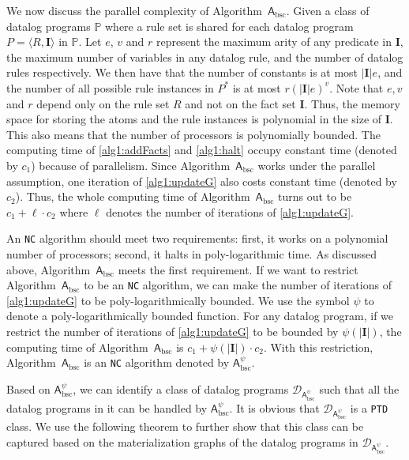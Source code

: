 We now discuss the parallel complexity of Algorithm~$\mathsf{A}_{\text{bsc}}$.
Given a class of datalog programs $\mathbb{P}$ where
a rule set is shared for each datalog program $P=\langle R, \textbf{I}\rangle$ in $\mathbb{P}$.
Let $e$, $v$ and $r$ represent the maximum arity of any predicate in $\textbf{I}$, the maximum number of variables
in any datalog rule, and the number of datalog rules respectively.
We then have that the number of
constants is at most $|\textbf{I}|e$, and the number of all possible rule instances in $P^*$
is at most $r(|\textbf{I}|e)^v$.
Note that $e, v$ and $r$ depend only on the rule set $R$ and not on the fact set $\textbf{I}$.
Thus, the memory space for storing the atoms and the rule instances is polynomial in the size of $\textbf{I}$.
This also means that the number of processors is polynomially bounded.
The computing time of \ref{alg1:addFacts} and \ref{alg1:halt} occupy constant time (denoted by $c_1$) because of parallelism.
Since Algorithm~$\mathsf{A}_{\text{bsc}}$ works under the parallel assumption, one iteration of
\ref{alg1:updateG} also costs constant time (denoted by $c_2$). Thus,
the whole computing time of Algorithm~$\mathsf{A}_{\text{bsc}}$ turns out to be $c_1+\ell\cdot c_2$
where $\ell$ denotes the number of iterations of \ref{alg1:updateG}.

An \texttt{NC} algorithm should meet two requirements: first,
it works on a polynomial number of processors; second, it halts in poly-logarithmic time.
As discussed above, Algorithm~$\mathsf{A}_{\text{bsc}}$ meets the first requirement.
If we want to restrict Algorithm~$\mathsf{A}_{\text{bsc}}$ to be an \texttt{NC} algorithm,
we can make the number of iterations of \ref{alg1:updateG} to be poly-logarithmically bounded.
We use the symbol $\psi$ to denote a poly-logarithmically bounded function.
For any datalog program, if we restrict the number of iterations of
\ref{alg1:updateG} to be bounded by $\psi(|\textbf{I}|)$,
the computing time of Algorithm~$\mathsf{A}_{\text{bsc}}$
is $c_1+\psi(|\textbf{I}|)\cdot c_2$. With this restriction, Algorithm~$\mathsf{A}_{\text{bsc}}$ is an \texttt{NC} algorithm denoted by
$\mathsf{A}_{\text{bsc}}^{\psi}$.

Based on $\mathsf{A}_{\text{bsc}}^{\psi}$, we can identify a class of datalog programs
$\mathcal{D}_{\mathsf{A}_{\text{bsc}}^{\psi}}$ such that all the datalog programs in it can be handled
by $\mathsf{A}_{\text{bsc}}^{\psi}$.
It is obvious that $\mathcal{D}_{\mathsf{A}_{\text{bsc}}^{\psi}}$ is a \texttt{PTD} class.
We use the following theorem to further show that this class can be captured based on
the materialization graphs of the datalog programs in $\mathcal{D}_{\mathsf{A}_{\text{bsc}}^{\psi}}$.

